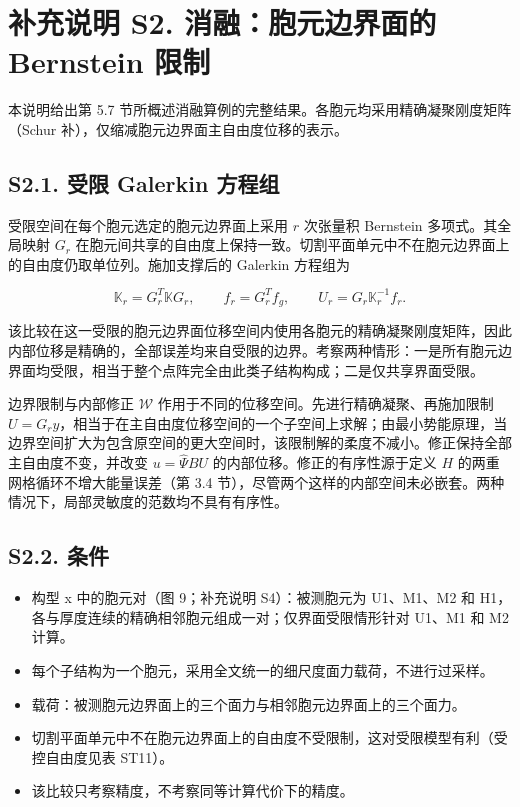 \documentclass[preprint,12pt,authoryear]{elsarticle}
\providecommand{\tightlist}{\setlength{\itemsep}{0pt}\setlength{\parskip}{0pt}}
\begin{document}
\section{补充说明 S2. 消融：胞元边界面的 Bernstein 限制}

本说明给出第 5.7 节所概述消融算例的完整结果。各胞元均采用精确凝聚刚度矩阵（Schur 补），仅缩减胞元边界面主自由度位移的表示。

\subsection{S2.1. 受限 Galerkin 方程组}

受限空间在每个胞元选定的胞元边界面上采用 \(r\) 次张量积 Bernstein 多项式。其全局映射 \(G_r\) 在胞元间共享的自由度上保持一致。切割平面单元中不在胞元边界面上的自由度仍取单位列。施加支撑后的 Galerkin 方程组为

\[
\mathbb K_r=G_r^T\mathbb K G_r,\qquad
f_r=G_r^Tf_g,\qquad U_r=G_r\mathbb K_r^{-1}f_r.
\tag{S2.1}
\]

该比较在这一受限的胞元边界面位移空间内使用各胞元的精确凝聚刚度矩阵，因此内部位移是精确的，全部误差均来自受限的边界。考察两种情形：一是所有胞元边界面均受限，相当于整个点阵完全由此类子结构构成；二是仅共享界面受限。

边界限制与内部修正 \(\mathcal W\) 作用于不同的位移空间。先进行精确凝聚、再施加限制 \(U=G_ry\)，相当于在主自由度位移空间的一个子空间上求解；由最小势能原理，当边界空间扩大为包含原空间的更大空间时，该限制解的柔度不减小。修正保持全部主自由度不变，并改变 \(u=\widehat\Psi BU\) 的内部位移。修正的有序性源于定义 \(H\) 的两重网格循环不增大能量误差（第 3.4 节），尽管两个这样的内部空间未必嵌套。两种情况下，局部灵敏度的范数均不具有有序性。

\subsection{S2.2. 条件}

\begin{itemize}
\tightlist
\item
  构型 x 中的胞元对（图 9；补充说明 S4）：被测胞元为 U1、M1、M2 和 H1，各与厚度连续的精确相邻胞元组成一对；仅界面受限情形针对 U1、M1 和 M2 计算。
\item
  每个子结构为一个胞元，采用全文统一的细尺度面力载荷，不进行过采样。
\item
  载荷：被测胞元边界面上的三个面力与相邻胞元边界面上的三个面力。
\item
  切割平面单元中不在胞元边界面上的自由度不受限制，这对受限模型有利（受控自由度见表 ST11）。
\item
  该比较只考察精度，不考察同等计算代价下的精度。
\end{itemize}
\end{document}
